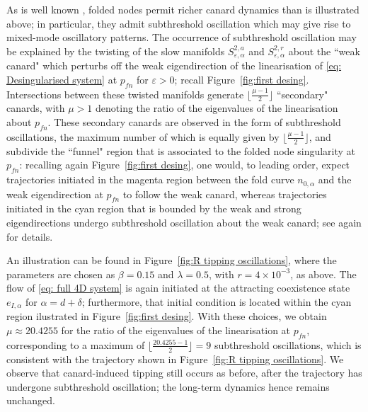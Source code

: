 \documentclass{article}
\theoremstyle{definition}
\numberwithin{equation}{section}
\begin{document}
As is well known \cite{MR2916308,MR2136520}, folded nodes permit richer canard dynamics than is illustrated above; in particular, they admit subthreshold oscillation which may give rise to mixed-mode oscillatory patterns. The occurrence of subthreshold oscillation may be explained by the twisting of the slow manifolds  $S^{2,a}_{\varepsilon,\alpha}$ and $S^{2,r}_{\varepsilon,\alpha}$ about the ``weak canard" which perturbs off the weak eigendirection of the linearisation of \eqref{eq: Desingularised system} at $p_{fn}$ for $\varepsilon>0$; recall Figure~\ref{fig:first desing}. Intersections between these twisted manifolds generate $\lfloor \frac{\mu-1}{2}\rfloor$ ``secondary" canards, with $\mu>1$ denoting the ratio of the eigenvalues of the linearisation about $p_{fn}$. These secondary canards are observed in the form of subthreshold oscillations, the maximum number of which is equally given by $\lfloor \frac{\mu-1}{2}\rfloor$, and subdivide the ``funnel" region that is associated to the folded node singularity at $p_{fn}$: recalling again Figure~\ref{fig:first desing}, one would, to leading order, expect trajectories initiated in the magenta region between the fold curve $n_{0,\alpha}$ and the weak eigendirection at $p_{fn}$ to follow the weak canard, whereas trajectories initiated in the cyan region that is bounded by the weak and strong eigendirections undergo subthreshold oscillation about the weak canard; see again \cite{MR2916308,MR2136520} for details.

An illustration can be found in Figure~\ref{fig:R tipping oscillations}, where the parameters are chosen as $\beta=0.15$ and $\lambda = 0.5$, with $r=4\times 10^{-3}$, as above. The flow of \eqref{eq: full 4D system} is again initiated at the attracting coexistence state $e_{I,\alpha}$ for $\alpha=d+\delta$; furthermore, that initial condition is located within the cyan region ilustrated in Figure~\ref{fig:first desing}. With these choices, we obtain $\mu\approx 20.4255$ for the ratio of the eigenvalues of the linearisation at $p_{fn}$, corresponding to a maximum of $\lfloor \frac{20.4255-1}{2}\rfloor=9$ subthreshold oscillations, which is consistent with the trajectory shown in Figure~\ref{fig:R tipping oscillations}. We observe that canard-induced tipping still occurs as before, after the trajectory has undergone subthreshold oscillation; the long-term dynamics hence remains unchanged. 
\end{document}
